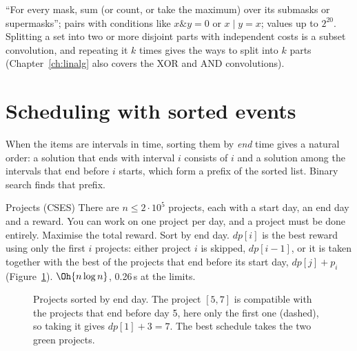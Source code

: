 
\begin{recognize}
``For every mask, sum (or count, or take the maximum) over its submasks or supermasks''; pairs with conditions like $x \mathbin{\&} y
= 0$ or $x \mid y = x$; values up to $2^{20}$. Splitting a set into two or more disjoint parts with independent costs is a subset
convolution, and repeating it $k$ times gives the ways to split into $k$ parts (Chapter~\ref{ch:linalg} also covers the XOR and AND
convolutions).
\end{recognize}

\section[Scheduling with sorted events]{Scheduling with sorted events \hfill \gold}\label{sec:intervalsched}

When the items are intervals in time, sorting them by \emph{end} time gives a natural order: a solution that ends with interval $i$
consists of $i$ and a solution among the intervals that end before $i$ starts, which form a prefix of the sorted list. Binary search
finds that prefix.

\begin{problem}{Projects (CSES)}
There are $n \le 2 \cdot 10^5$ projects, each with a start day, an end day and a reward. You can work on one project per day, and a
project must be done entirely. Maximise the total reward.
\solution Sort by end day. $dp[i]$ is the best reward using only the first $i$ projects: either project $i$ is skipped, $dp[i-1]$, or
it is taken together with the best of the projects that end before its start day, $dp[j] + p_i$ (Figure~\ref{fig:projects}).
$\Oh{n \log n}$, 0.26\,s at the limits.
\end{problem}

\begin{figure}[htbp]
\centering
{}
\caption{Projects sorted by end day. The project $[5, 7]$ is compatible with the projects that end before day 5, here only the
first one (dashed), so taking it gives $dp[1] + 3 = 7$. The best schedule takes the two green projects.}
\label{fig:projects}
\end{figure}

